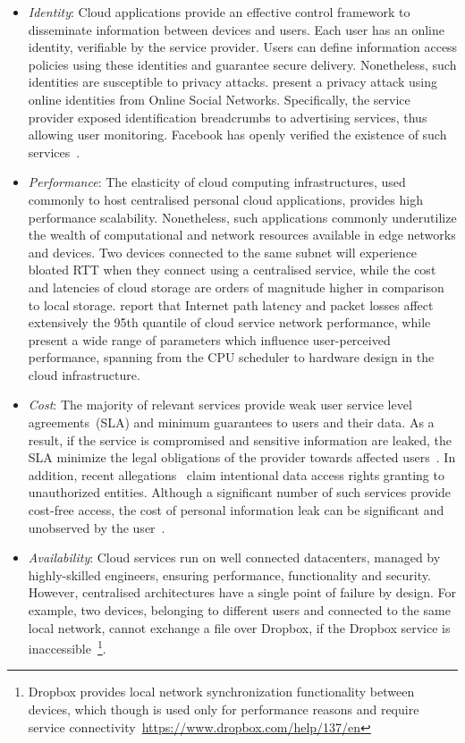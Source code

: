 \begin{itemize}
  \item{\it Identity}\/: Cloud applications provide an effective control
    framework to disseminate information between devices and users.  Each user
    has an online identity, verifiable by the service provider.
    Users can define information access policies using these identities and
    guarantee secure delivery. Nonetheless, such identities are susceptible  to
    privacy attacks.  present a privacy attack using
    online identities from Online Social Networks. Specifically,
    the service provider exposed identification breadcrumbs to advertising
    services, thus allowing user monitoring.  Facebook has openly verified the
    existence of such services~.  

\item {\it Performance}\/: The elasticity of cloud computing infrastructures,
  used commonly to host centralised personal cloud applications, provides
  high performance scalability.  Nonetheless, such applications 
  commonly underutilize the wealth of computational and network resources
  available in edge networks and devices.  Two devices connected to the same
  subnet will experience bloated RTT when they connect using a centralised
  service, while the cost and latencies of cloud storage are orders of
  magnitude higher in comparison to local storage.  report
  that Internet path latency and packet losses affect extensively the 95th
  quantile of cloud service network performance, while  present
  a wide range of parameters which influence user-perceived performance,
  spanning from the CPU scheduler to hardware design in the cloud infrastructure.

\item {\it Cost}\/: 
  The majority of relevant services provide weak user service level
  agreements~(SLA) and minimum guarantees to users and their data. As a result,
  if the service is compromised and sensitive information are leaked, the SLA
  minimize the legal obligations of the provider towards affected
  users~. In addition, recent
  allegations~ claim intentional data access rights
  granting to unauthorized entities.  Although a significant number of such
  services provide cost-free access, the cost of personal information leak can
  be significant and unobserved by the user~\cite{Liu2011}.

\item {\it Availability}\/: Cloud services run on well connected
  datacenters, managed by highly-skilled engineers, ensuring performance,
  functionality and security. However, centralised architectures have a single
  point of failure by design. For example, two devices, belonging to different
  users and connected to the same local network, cannot exchange a file over
  Dropbox, if the Dropbox service is inaccessible~\footnote{Dropbox provides
    local network synchronization functionality between devices, which though is
    used only for performance reasons and require service
    connectivity~\url{https://www.dropbox.com/help/137/en}}. 


\end{itemize}
